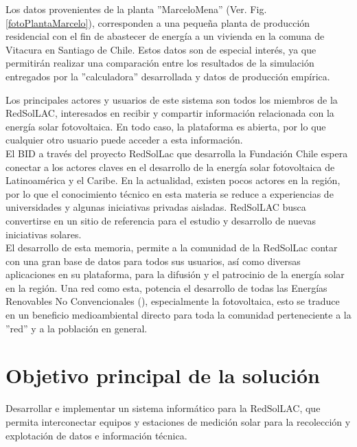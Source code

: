 Los datos provenientes de la planta ''MarceloMena'' (Ver. Fig. \ref{fotoPlantaMarcelo}), corresponden a una pequeña planta de producción residencial con el fin de abastecer de energía a un vivienda en la comuna de Vitacura en Santiago de Chile. Estos datos son de especial interés, ya que permitirán realizar una comparación entre los resultados de la simulación entregados por la ''calculadora'' desarrollada y datos de producción empírica.

Los principales actores y usuarios de este sistema son todos los miembros de la RedSolLAC, interesados en recibir y compartir información relacionada con la energía solar fotovoltaica. En todo caso, la plataforma es abierta, por lo que cualquier otro usuario puede acceder a esta información.\\

El BID a través del proyecto RedSolLac que desarrolla la Fundación Chile espera conectar a los actores claves en el desarrollo de la energía solar fotovoltaica de Latinoamérica y el Caribe. En la actualidad, existen pocos actores en la región, por lo que el conocimiento técnico en esta materia se reduce a experiencias de universidades y algunas iniciativas privadas aisladas. RedSolLAC busca convertirse en un sitio de referencia para el estudio y desarrollo de nuevas iniciativas solares.\\

El desarrollo de esta memoria, permite a la comunidad de la RedSolLac contar con una gran base de datos para todos sus usuarios, así como diversas aplicaciones en su plataforma, para la difusión y el patrocinio de la energía solar en la región. Una red como esta, potencia el desarrollo de todas las Energías Renovables No Convencionales (), especialmente la fotovoltaica, esto se traduce en un beneficio medioambiental directo para toda la comunidad perteneciente a la ''red'' y a la población en general.

\section{Objetivo principal de la solución}
Desarrollar e implementar un sistema informático para la RedSolLAC, que permita interconectar equipos y estaciones de medición solar para la recolección y explotación de datos e información técnica.

